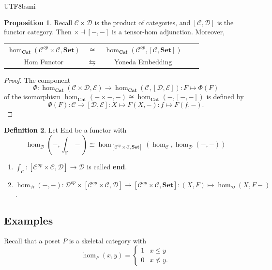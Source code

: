 \documentclass[12pt]{article}
\theoremstyle{definition}
\newtheorem{definition}{Definition}[section]
\newtheorem{property}[definition]{Proposition}
\newcommand\<{\langle}
\renewcommand\>{\rangle}
\begin{document}
\begin{CJK}{UTF8}{bsmi}
\begin{property}
    Recall $\mathcal{C}\times\mathcal{D}$ is the product of categories, and $[\mathcal{C}, \mathcal{D}]$ is the functor category.
    Then $\times\dashv[-, -]$ is a tensor-hom adjunction.
    Moreover, 
    \begin{center}
    \begin{tabular}{ccccc}
        $\hom_\textbf{Cat}(\mathcal{C}^{op}\times\mathcal{C}, \textbf{Set})$ & $\cong$ & $\hom_\textbf{Cat}(\mathcal{C}^{op}, [\mathcal{C}, \textbf{Set}])$ \\[2pt]
        Hom Functor & $\leftrightarrows$ & Yoneda Embedding
    \end{tabular}
    \end{center}
\end{property}
\begin{proof}
    The component
    \[
        \Phi:\hom_\textbf{Cat}(\mathcal{C}\times\mathcal{D}, \mathcal{E})\to\hom_\textbf{Cat}(\mathcal{C}, [\mathcal{D}, \mathcal{E}]):F\mapsto\Phi(F)
    \]
    of the isomorphism $\hom_\textbf{Cat}(-\times-, -)\cong\hom_\textbf{Cat}(-, [-, -])$ is defined by
    \[
        \Phi(F):\mathcal{C}\to[\mathcal{D}, \mathcal{E}]:
        X\mapsto F(X, -):f\mapsto F(f, -).
    \]
\end{proof}

\begin{definition}
    Let End be a functor with
    \[\textstyle
        \hom_\mathcal{D}(-, \int_\mathcal{C}-)\cong
        \hom_{[\mathcal{C}^{op}\times\mathcal{C}, \textbf{Set}]}(\hom_\mathcal{C}, \hom_\mathcal{D}(-, -))
    \]
    \begin{enumerate}
        \item $\int_\mathcal{C}:[\mathcal{C}^{op}\times\mathcal{C}, \mathcal{D}]\to\mathcal{D}$ is called \textbf{end}.
        \item $\hom_\mathcal{D}(-, -):\mathcal{D}^{op}\times[\mathcal{C}^{op}\times\mathcal{C}, \mathcal{D}]\to[\mathcal{C}^{op}\times\mathcal{C}, \textbf{Set}]:(X, F)\mapsto \hom_\mathcal{D}(X, F-)$.
    \end{enumerate}
\end{definition}

\subsection{Examples}

Recall that a poset $P$ is a skeletal category with
\[
    \hom_P(x, y) = \begin{cases}
        1 & x\le y \\
        0 & x\not\le y.
    \end{cases}
\]


\end{CJK}
\end{document}
